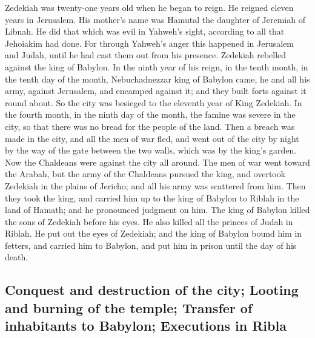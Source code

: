  Zedekiah was twenty-one years old when he began to reign.
He reigned eleven years in Jerusalem. His mother's name was Hamutal the
daughter of Jeremiah of Libnah.  He did that which was
evil in Yahweh's sight, according to all that Jehoiakim had done.
 For through Yahweh's anger this happened in Jerusalem and
Judah, until he had cast them out from his presence. Zedekiah rebelled
against the king of Babylon.  In the ninth year of his
reign, in the tenth month, in the tenth day of the month, Nebuchadnezzar
king of Babylon came, he and all his army, against Jerusalem, and
encamped against it; and they built forts against it round about.
 So the city was besieged to the eleventh year of King
Zedekiah.  In the fourth month, in the ninth day of the
month, the famine was severe in the city, so that there was no bread for
the people of the land.  Then a breach was made in the
city, and all the men of war fled, and went out of the city by night by
the way of the gate between the two walls, which was by the king's
garden. Now the Chaldeans were against the city all around. The men of
war went toward the Arabah,  but the army of the Chaldeans
pursued the king, and overtook Zedekiah in the plains of Jericho; and
all his army was scattered from him.  Then they took the
king, and carried him up to the king of Babylon to Riblah in the land of
Hamath; and he pronounced judgment on him.  The king of
Babylon killed the sons of Zedekiah before his eyes. He also killed all
the princes of Judah in Riblah.  He put out the eyes of
Zedekiah; and the king of Babylon bound him in fetters, and carried him
to Babylon, and put him in prison until the day of his death.

\hypertarget{conquest-and-destruction-of-the-city-looting-and-burning-of-the-temple-transfer-of-inhabitants-to-babylon-executions-in-ribla}{%
\subsection{Conquest and destruction of the city; Looting and burning of
the temple; Transfer of inhabitants to Babylon; Executions in
Ribla}\label{conquest-and-destruction-of-the-city-looting-and-burning-of-the-temple-transfer-of-inhabitants-to-babylon-executions-in-ribla}}

